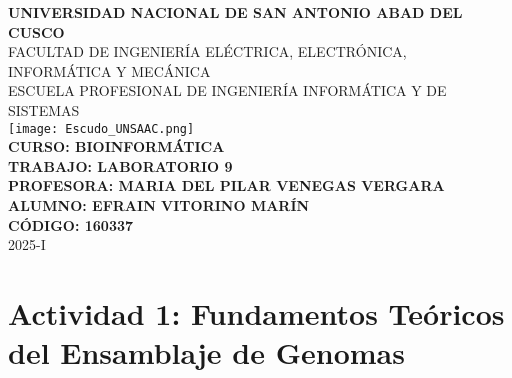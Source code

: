 \documentclass[fleqn,10pt]{article}
\begin{document}
\begin{center}
    {\LARGE\bfseries UNIVERSIDAD NACIONAL DE SAN ANTONIO ABAD DEL CUSCO}\\[0.3cm]
    {\Large FACULTAD DE INGENIERÍA ELÉCTRICA, ELECTRÓNICA, INFORMÁTICA Y MECÁNICA}\\[0.3cm]
    {\Large ESCUELA PROFESIONAL DE INGENIERÍA INFORMÁTICA Y DE SISTEMAS}\\[1cm]
    \texttt{[image: Escudo\_UNSAAC.png]}\\[1cm]
    {\Large\bfseries CURSO: BIOINFORMÁTICA}\\[0.3cm]
    {\Large\bfseries TRABAJO: LABORATORIO 9 }\\[0.3cm]
    {\Large\bfseries PROFESORA: MARIA DEL PILAR VENEGAS VERGARA}\\[0.3cm]
    {\Large\bfseries ALUMNO: EFRAIN VITORINO MARÍN}\\[0.3cm]
    {\Large\bfseries CÓDIGO: 160337}\\[0.3cm]
    {\Large 2025-I}
\end{center}
\newpage

\section{Actividad 1: Fundamentos Teóricos del Ensamblaje de Genomas}
\end{document}
